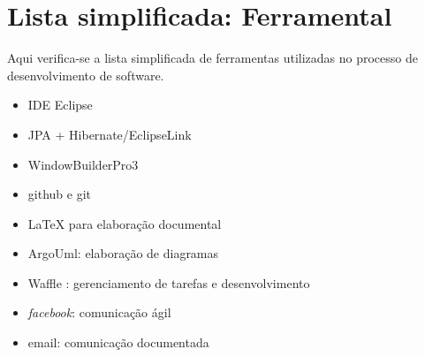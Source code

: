 \documentclass[12pt,a4paper]{article}
\begin{document}
	\section{Lista simplificada: Ferramental}
	Aqui verifica-se a lista simplificada de ferramentas utilizadas no processo de desenvolvimento de software.
	\begin{itemize}
	\item IDE Eclipse
	\item JPA + Hibernate/EclipseLink
	\item WindowBuilderPro3
	\item github e git
	\item LaTeX para elaboração documental
	\item ArgoUml: elaboração de diagramas
	\item Waffle : gerenciamento de tarefas e desenvolvimento
	\item \textit{facebook}: comunicação ágil
	\item email: comunicação documentada
	\end{itemize}
\end{document}
